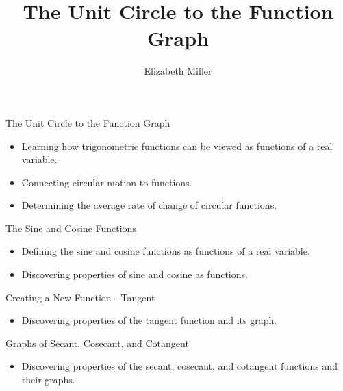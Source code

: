 \documentclass{ximera}
\author{Elizabeth Miller}
\title{The Unit Circle to the Function Graph}
\begin{document}
\begin{abstract}
\end{abstract}
\maketitle


\begin{objectives}

\item The Unit Circle to the Function Graph
	\begin{itemize}
		\item Learning how trigonometric functions can be viewed as functions of a real variable. 
		\item Connecting circular motion to functions. 
		\item Determining the average rate of change of circular functions.
	\end{itemize}

\item The Sine and Cosine Functions
	\begin{itemize}
		\item Defining the sine and cosine functions as functions of a real variable.
		\item Discovering properties of sine and cosine as functions.
	\end{itemize}

\item Creating a New Function - Tangent
	\begin{itemize}
		\item Discovering properties of the tangent function and its graph. 
	\end{itemize}

\item Graphs of Secant, Cosecant, and Cotangent
	\begin{itemize}
		\item Discovering properties of the secant, cosecant, and cotangent functions and their graphs. 
	\end{itemize}

\end{objectives}
\end{document}

